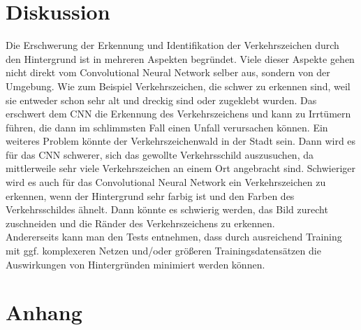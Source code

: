 \documentclass[paper=A4,pagesize=auto,12pt,headinclude=true,footinclude=true,BCOR=0mm,DIV=calc]{scrartcl}
\renewcommand{\listoffigures}{\begingroup
	\tocsection
	\tocfile{\listfigurename}{lof}
	\endgroup}
\renewcommand{\listoftables}{\begingroup
	\tocsection
	\tocfile{\listtablename}{lot}
	\endgroup}
\begin{document}
\section{Diskussion}
Die Erschwerung der Erkennung und Identifikation der Verkehrszeichen durch den Hintergrund ist in mehreren Aspekten begründet.
Viele dieser Aspekte gehen nicht direkt vom Convolutional Neural Network selber aus, sondern von der Umgebung. Wie zum Beispiel Verkehrszeichen, die schwer zu erkennen sind, weil sie entweder schon sehr alt und dreckig sind oder zugeklebt wurden. Das erschwert dem CNN die Erkennung des Verkehrszeichens und kann zu Irrtümern führen, die dann im schlimmsten Fall einen Unfall verursachen können. 
Ein weiteres Problem könnte der Verkehrszeichenwald in der Stadt sein. Dann wird es für das CNN schwerer, sich das gewollte Verkehrsschild auszusuchen, da mittlerweile sehr viele Verkehrszeichen an einem Ort angebracht sind. Schwieriger wird es auch für das Convolutional Neural Network ein Verkehrszeichen zu erkennen, wenn der Hintergrund sehr farbig ist und den Farben des Verkehrsschildes ähnelt. Dann könnte es schwierig werden, das Bild zurecht zuschneiden und die Ränder des Verkehrszeichens zu erkennen.\cite{discuss1}\\
Andererseits kann man den Tests entnehmen, dass durch ausreichend Training mit ggf. komplexeren Netzen und/oder größeren Trainingsdatensätzen die Auswirkungen von Hintergründen minimiert werden können.

\printbibliography[heading=bibnumbered]


\listoffigures
\listoftables

\section{Anhang}
\end{document}
